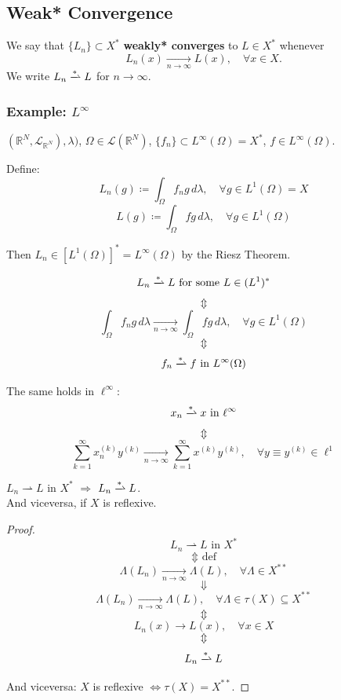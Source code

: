 \subsection{Weak* Convergence}

\begin{definition}
We say that $\{L_n\} \subset X^*$ \textbf{weakly* converges} to $L \in X^*$ whenever
\[
L_n(x) \xrightarrow[n \to \infty]{} L(x), \quad \forall x \in X.
\]
We write $L_n \xrightharpoonup{\ast} L$ for $n \to \infty$.
\end{definition}

\subsubsection*{Example: $L^\infty$}

$(\mathbb{R}^N, \mathcal{L}_{\mathbb{R}^N}), \lambda)$, $\Omega \in \mathcal{L}(\mathbb{R}^N)$,
$\{f_n\} \subset L^\infty(\Omega) = X^*$, $f \in L^\infty(\Omega)$.

Define:
\[
L_n(g) \coloneqq \int_\Omega f_n g \, d\lambda, \quad \forall g \in L^1(\Omega) = X
\]
\[
L(g) \coloneqq \int_\Omega f g \, d\lambda, \quad \forall g \in L^1(\Omega)
\]

Then $L_n \in [L^1(\Omega)]^* = L^\infty(\Omega)$ by the Riesz Theorem.

\[
L_n \xrightharpoonup{\ast} L \text{ for some } L \in (L^1)^*
\]
\[
\Updownarrow
\]
\[
\int_\Omega f_n g \, d\lambda \xrightarrow[n \to \infty]{} \int_\Omega f g \, d\lambda, \quad \forall g \in L^1(\Omega)
\]
\[
\Updownarrow
\]
\[
f_n \xrightharpoonup{\ast} f \text{ in } L^\infty(\Omega)
\]

\begin{remark}
The same holds in $\ell^\infty$:
\[
x_n \xrightharpoonup{\ast} x \text{ in } \ell^\infty
\]
\[
\Updownarrow
\]
\[
\sum_{k=1}^\infty x_n^{(k)} y^{(k)} \xrightarrow[n \to \infty]{} \sum_{k=1}^\infty x^{(k)} y^{(k)}, \quad \forall y \equiv y^{(k)} \in \ell^1
\]
\end{remark}

\begin{theorem}
$L_n \rightharpoonup L$ in $X^*$ $\Rightarrow$ $L_n \xrightharpoonup{\ast} L$. \\
And viceversa, if $X$ is reflexive.
\end{theorem}

\begin{proof}
\[
L_n \rightharpoonup L \text{ in } X^*
\]
\[
\Updownarrow \text{ def}
\]
\[
\Lambda(L_n) \xrightarrow[n \to \infty]{} \Lambda(L), \quad \forall \Lambda \in X^{**}
\]
\[
\Downarrow
\]
\[
\Lambda(L_n) \xrightarrow[n \to \infty]{} \Lambda(L), \quad \forall \Lambda \in \tau(X) \subseteq X^{**}
\]
\[
\Updownarrow
\]
\[
L_n(x) \to L(x), \quad \forall x \in X
\]
\[
\Updownarrow
\]
\[
L_n \xrightharpoonup{\ast} L
\]

And viceversa:
$X$ is reflexive $\iff \tau(X) = X^{**}$.
\end{proof}

